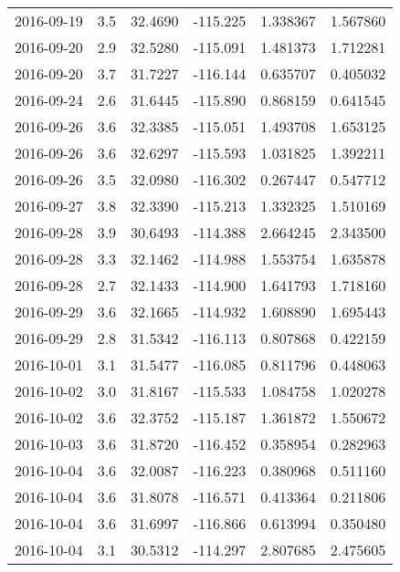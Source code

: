 \begin{tabular}{lrrrrr}
2016-09-19 &       3.5 &  32.4690 &  -115.225 &         1.338367 &         1.567860 \\
2016-09-20 &       2.9 &  32.5280 &  -115.091 &         1.481373 &         1.712281 \\
2016-09-20 &       3.7 &  31.7227 &  -116.144 &         0.635707 &         0.405032 \\
2016-09-24 &       2.6 &  31.6445 &  -115.890 &         0.868159 &         0.641545 \\
2016-09-26 &       3.6 &  32.3385 &  -115.051 &         1.493708 &         1.653125 \\
2016-09-26 &       3.6 &  32.6297 &  -115.593 &         1.031825 &         1.392211 \\
2016-09-26 &       3.5 &  32.0980 &  -116.302 &         0.267447 &         0.547712 \\
2016-09-27 &       3.8 &  32.3390 &  -115.213 &         1.332325 &         1.510169 \\
2016-09-28 &       3.9 &  30.6493 &  -114.388 &         2.664245 &         2.343500 \\
2016-09-28 &       3.3 &  32.1462 &  -114.988 &         1.553754 &         1.635878 \\
2016-09-28 &       2.7 &  32.1433 &  -114.900 &         1.641793 &         1.718160 \\
2016-09-29 &       3.6 &  32.1665 &  -114.932 &         1.608890 &         1.695443 \\
2016-09-29 &       2.8 &  31.5342 &  -116.113 &         0.807868 &         0.422159 \\
2016-10-01 &       3.1 &  31.5477 &  -116.085 &         0.811796 &         0.448063 \\
2016-10-02 &       3.0 &  31.8167 &  -115.533 &         1.084758 &         1.020278 \\
2016-10-02 &       3.6 &  32.3752 &  -115.187 &         1.361872 &         1.550672 \\
2016-10-03 &       3.6 &  31.8720 &  -116.452 &         0.358954 &         0.282963 \\
2016-10-04 &       3.6 &  32.0087 &  -116.223 &         0.380968 &         0.511160 \\
2016-10-04 &       3.6 &  31.8078 &  -116.571 &         0.413364 &         0.211806 \\
2016-10-04 &       3.6 &  31.6997 &  -116.866 &         0.613994 &         0.350480 \\
2016-10-04 &       3.1 &  30.5312 &  -114.297 &         2.807685 &         2.475605 \\

\end{tabular}
